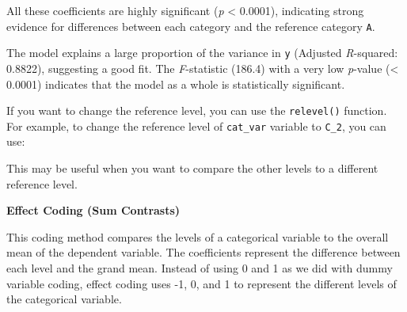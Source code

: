 \documentclass[
  letterpaper,
]{book}
\newenvironment{Shaded}{\begin{snugshade}}{\end{snugshade}}
\newcommand{\AttributeTok}[1]{\textcolor[rgb]{0.40,0.45,0.13}{#1}}
\newcommand{\CommentTok}[1]{\textcolor[rgb]{0.37,0.37,0.37}{#1}}
\newcommand{\DecValTok}[1]{\textcolor[rgb]{0.68,0.00,0.00}{#1}}
\newcommand{\FunctionTok}[1]{\textcolor[rgb]{0.28,0.35,0.67}{#1}}
\newcommand{\NormalTok}[1]{\textcolor[rgb]{0.00,0.23,0.31}{#1}}
\newcommand{\OtherTok}[1]{\textcolor[rgb]{0.00,0.23,0.31}{#1}}
\newcommand{\SpecialCharTok}[1]{\textcolor[rgb]{0.37,0.37,0.37}{#1}}
\newcommand{\StringTok}[1]{\textcolor[rgb]{0.13,0.47,0.30}{#1}}
\begin{document}
All these coefficients are highly significant (\emph{p} \textless{}
0.0001), indicating strong evidence for differences between each
category and the reference category \texttt{A}.

The model explains a large proportion of the variance in \texttt{y}
(Adjusted \emph{R}-squared: 0.8822), suggesting a good fit. The
\emph{F}-statistic (186.4) with a very low \emph{p}-value (\textless{}
0.0001) indicates that the model as a whole is statistically
significant.

If you want to change the reference level, you can use the
\texttt{relevel()} function. For example, to change the reference level
of \texttt{cat\_var} variable to \texttt{C\_2}, you can use:

\begin{Shaded}
\end{Shaded}

This may be useful when you want to compare the other levels to a
different reference level.

\textbf{Effect Coding (Sum Contrasts)}

This coding method compares the levels of a categorical variable to the
overall mean of the dependent variable. The coefficients represent the
difference between each level and the grand mean. Instead of using 0 and
1 as we did with dummy variable coding, effect coding uses -1, 0, and 1
to represent the different levels of the categorical variable.
\end{document}
